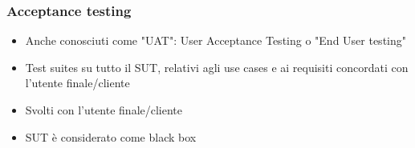 \subsubsection{Acceptance testing}
\begin{itemize}
    \item Anche conosciuti come "UAT": User Acceptance Testing o "End User testing"
    \item Test suites su tutto il SUT, relativi agli use cases e ai requisiti concordati con l'utente finale/cliente
    \item Svolti con l'utente finale/cliente
    \item SUT è considerato come black box
\end{itemize}

\newpage